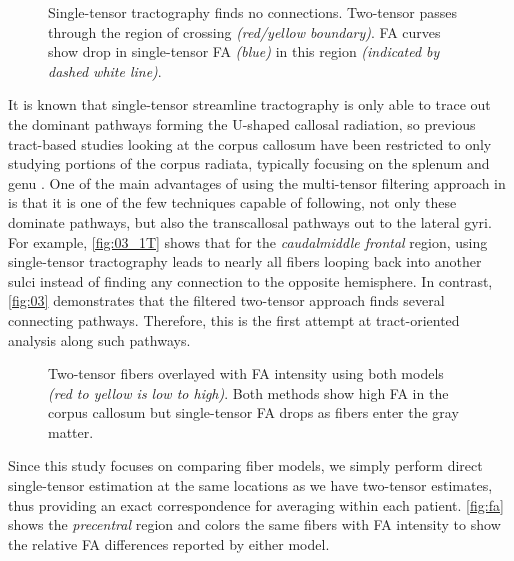 \documentclass[final,hyperref]{gatech-thesis}
\newcommand{\region}[1]{\textit{#1}\xspace}
\newcommand{\green}{\region{caudalmiddle frontal}}
\newcommand{\blue}{\region{precentral}}
\begin{document}
\begin{figure}[t]
  \centering
  \quad
  \caption{Single-tensor tractography finds no connections.  Two-tensor passes
    through the region of crossing \textit{(red/yellow boundary)}.  FA curves
    show drop in single-tensor FA \textit{(blue)} in this region
    \textit{(indicated by dashed white line)}.}
  \label{fig:ds_1T}
\end{figure}
It is known that single-tensor streamline tractography is only able to trace
out the dominant pathways forming the U-shaped callosal radiation, so previous
tract-based studies looking at the corpus callosum have been restricted to
only studying portions of the corpus radiata, typically focusing on the
splenum and genu \cite{Corouge2006,Fletcher2007ipmi,Goodlett2008,Maddah2008}.
%
One of the main advantages of using the multi-tensor filtering approach in
\cite{Malcolm2009ipmi} is that it is one of the few techniques capable of
following, not only these dominate pathways, but also the transcallosal
pathways out to the lateral gyri.  For example, \autoref{fig:03_1T} shows that
for the \green region, using single-tensor tractography leads to nearly all
fibers looping back into another sulci instead of finding any connection to
the opposite hemisphere.  In contrast, \autoref{fig:03} demonstrates that the
filtered two-tensor approach finds several connecting pathways.  Therefore,
this is the first attempt at tract-oriented analysis along such pathways.

\begin{figure}[t]
  \centering
  \caption{Two-tensor fibers overlayed with FA intensity using both models
    \textit{(red to yellow is low to high)}.  Both methods show high FA in the
    corpus callosum but single-tensor FA drops as fibers enter the gray
    matter.}
  \label{fig:fa}
\end{figure}
Since this study focuses on comparing fiber models, we simply perform direct
single-tensor estimation at the same locations as we have two-tensor
estimates, thus providing an exact correspondence for averaging within each
patient.  \autoref{fig:fa} shows the \blue region and colors the same fibers
with FA intensity to show the relative FA differences reported by either
model.
\end{document}
